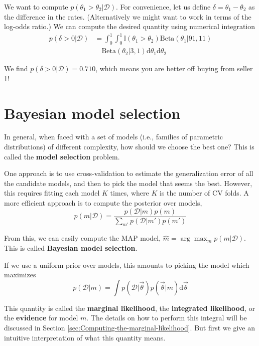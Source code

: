 We want to compute $p(\theta_1 >\theta_2|\mathcal{D})$. For convenience, let us define $\delta=\theta_1-\theta_2$ as the difference in the rates. (Alternatively we might want to work in terms of the log-odds ratio.) We can compute the desired quantity using numerical integration
\begin{equation}
\begin{split}
p(\delta>0|\mathcal{D}) & = \int_0^1\int_0^1 \mathbb{I}(\theta_1>\theta_2)\text{Beta}(\theta_1|91,11) \\
                        & \quad \text{Beta}(\theta_2|3,1)\mathrm{d}\theta_1\mathrm{d}\theta_2
\end{split}
\end{equation}

We find $p(\delta>0|\mathcal{D})=0.710$, which means you are better off buying from seller 1! 


\section{Bayesian model selection}
\label{sec:Bayesian-model-selection}

In general, when faced with a set of models (i.e., families of parametric distributions) of different complexity, how should we choose the best one? This is called the \textbf{model selection} problem.

One approach is to use cross-validation to estimate the generalization error of all the candidate models, and then to pick the model that seems the best. However, this requires fitting each model $K$ times, where $K$ is the number of CV folds. A more efficient approach is to compute the posterior over models,
\begin{equation}
p(m|\mathcal{D})=\dfrac{p(\mathcal{D}|m)p(m)}{\sum_{m'}p(\mathcal{D}|m')p(m')}
\end{equation}

From this, we can easily compute the MAP model, $\hat{m}=\arg\max_m{p(m|\mathcal{D})}$. This is called \textbf{Bayesian model selection}.

If we use a uniform prior over models, this amounts to picking the model which maximizes
\begin{equation}\label{eqn:marginal-likelihood}
p(\mathcal{D}|m)=\int{p(\mathcal{D}|\vec{\theta})p(\vec{\theta}|m)}\mathrm{d}\vec{\theta}
\end{equation}

This quantity is called the \textbf{marginal likelihood}, the \textbf{integrated likelihood}, or the \textbf{evidence} for model $m$. The details on how to perform this integral will be discussed in Section \ref{sec:Computing-the-marginal-likelihood}. But first we give an intuitive interpretation of what this quantity means.


